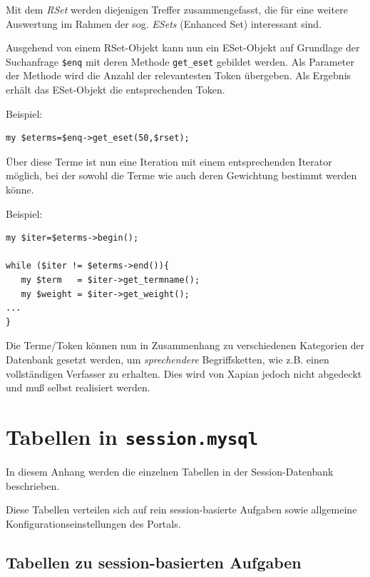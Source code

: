 \documentclass[11pt, twoside, a4paper, BCOR8mm, DIV12, bibtotoc,idxtotoc]{scrbook}
\begin{document}
Mit dem \emph{RSet} werden diejenigen Treffer zusammengefasst, die für
eine weitere Auswertung im Rahmen der sog. \emph{ESets} (Enhanced Set)
interessant sind.

Ausgehend von einem RSet-Objekt kann nun ein ESet-Objekt auf Grundlage
der Suchanfrage \texttt{\$enq} mit deren Methode \texttt{get\_eset}
gebildet werden. Als Parameter der Methode wird die Anzahl der
relevantesten Token übergeben. Als Ergebnis erhält das ESet-Objekt die
entsprechenden Token.

Beispiel:
\begin{verbatim}
my $eterms=$enq->get_eset(50,$rset);
\end{verbatim}

Über diese Terme ist nun eine Iteration mit einem entsprechenden
Iterator möglich, bei der sowohl die Terme wie auch deren Gewichtung
bestimmt werden könne.

Beispiel:
\begin{verbatim}
my $iter=$eterms->begin();
                    
while ($iter != $eterms->end()){
   my $term   = $iter->get_termname();
   my $weight = $iter->get_weight();
...
}
\end{verbatim}


Die Terme/Token können nun in Zusammenhang zu verschiedenen Kategorien der
Datenbank gesetzt werden, um \emph{sprechendere} Begriffsketten, wie
z.B. einen vollständigen Verfasser zu erhalten. Dies wird von Xapian
jedoch nicht abgedeckt und muß selbst realisiert werden.

\chapter{Tabellen in \texttt{session.mysql}}

In diesem Anhang werden die einzelnen Tabellen in der
Session-Datenbank beschrieben.


Diese Tabellen verteilen sich auf rein session-basierte Aufgaben sowie
allgemeine Konfigurations\-ein\-stellungen des Portals.


\section{Tabellen zu session-basierten Aufgaben}
\end{document}

